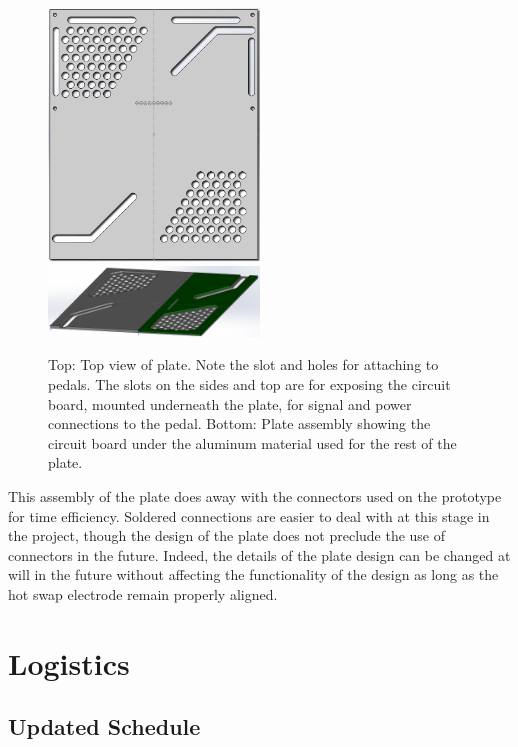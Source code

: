 \documentclass{article}
\begin{document}
	\begin{figure}
		\centering
		\includegraphics[width = 0.5\textwidth]{PR5Images/PlateALTopViewCAD.png}
		\includegraphics[width = 0.5\textwidth]{PR5Images/PlateAsmCAD.png}
		\caption{Top: Top view of plate.  Note the slot and holes for attaching to pedals.  The slots on the sides and top are for exposing the circuit board, mounted underneath the plate, for signal and power connections to the pedal.  Bottom: Plate assembly showing the circuit board under the aluminum material used for the rest of the plate.}
		\label{fig:plate}
	\end{figure}

	This assembly of the plate does away with the connectors used on the prototype for time efficiency.  Soldered connections are easier to deal with at this stage in the project, though the design of the plate does not preclude the use of connectors in the future.  Indeed, the details of the plate design can be changed at will in the future without affecting the functionality of the design as long as the hot swap electrode remain properly aligned.  

\newpage
\section{Logistics}

	\subsection{Updated Schedule}
\end{document}
